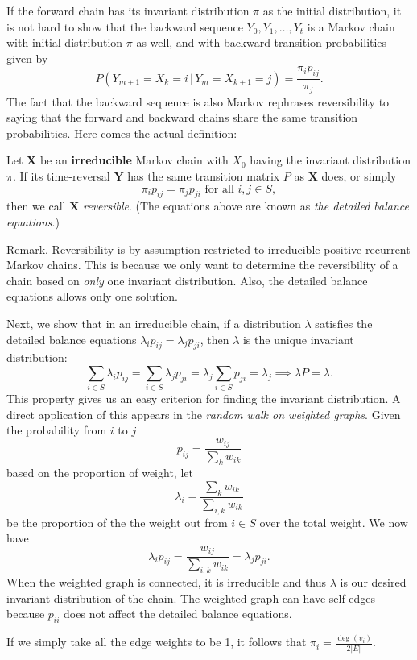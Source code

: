 \documentclass[11pt]{article}
\newcommand{\where}{\,|\,}
\newcommand{\abs}[1]{\lvert #1 \rvert}
\begin{document}
If the forward chain has its invariant distribution $\pi $ as the initial distribution, it is not hard to show that the backward sequence $Y_{0},Y_{1},\dots ,Y_{t}$ is a Markov chain with initial distribution $\pi $ as well, and with backward transition probabilities given by
\[
P(Y_{m+1}=X_{k}=i \where Y_{m}=X_{k+1}=j)=\frac{\pi _{i}p_{ij}}{\pi_{j}}.
\]
The fact that the backward sequence is also Markov rephrases reversibility to saying that the forward and backward chains share the same transition probabilities. Here comes the actual definition:

Let $\mathbf{X}$ be an \textbf{irreducible} Markov chain with $X_{0}$ having the invariant distribution $\pi $. If its time-reversal $\mathbf{Y}$ has the same transition matrix $P$ as $\mathbf{X}$ does, or simply \[
\pi _{i}p_{ij}=\pi _{j}p_{ji} \text{ for all } i,j\in S,\]
then we call $\mathbf{X}$ \textit{reversible}. (The equations above are known as \textit{the detailed balance equations}.)

Remark. Reversibility is by assumption restricted to irreducible positive recurrent Markov chains. This is because we only want to determine the reversibility of a chain based on \textit{only} one invariant distribution. Also, the detailed balance equations allows only one solution.

Next, we show that in an irreducible chain, if a distribution $\lambda $ satisfies the detailed balance equations $\lambda _{i}p_{ij}=\lambda _{j}p_{ji}$, then $\lambda $ is the unique invariant distribution:
\[
\sum_{i\in S}\lambda _{i}p_{ij}=\sum_{i\in S}\lambda _{j}p_{ji}=\lambda _{j}\sum_{i\in S}p_{ji}=\lambda _{j} \implies \lambda P=\lambda .
\]
This property gives us an easy criterion for finding the invariant distribution. A direct application of this appears in the \textit{random walk on weighted graphs}. Given the probability from $i$ to $j$
\[
p_{ij}=\frac{w_{ij}}{\sum_{k}w_{ik}}
\]
based on the proportion of weight, let
\[
\lambda _{i}=\frac{\sum_{k}w_{ik}}{\sum_{i,k}w_{ik}}
\]
be the proportion of the the weight out from $i\in S$ over the total weight. We now have
\[
\lambda _{i}p_{ij}=\frac{w_{ij}}{\sum_{i,k}w_{ik}}=\lambda _{j}p_{ji}.
\]
When the weighted graph is connected, it is irreducible and thus $\lambda $ is our desired invariant distribution of the chain. The weighted graph can have self-edges because $p_{ii}$ does not affect the detailed balance equations.

If we simply take all the edge weights to be 1, it follows that $\pi _{i}=\frac{\deg(v_{i})}{2 \abs{E}}$.
\end{document}
